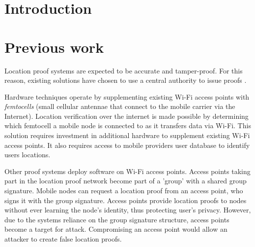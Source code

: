 \documentclass[12pt]{article}
\begin{document}
\maketitle

\begin{abstract}
\end{abstract}

\section{Introduction}

\section{Previous work}
Location proof systems are expected to be accurate and tamper-proof. For this reason, existing solutions have chosen to use a central authority to issue proofs \cite{brassil, luo, khan}.

Hardware techniques \cite{brassil} operate by supplementing existing Wi-Fi access points with \textit{femtocells} (small cellular antennae that connect to the mobile carrier via the Internet). Location verification over the internet is made possible by determining which femtocell a mobile node is connected to as it transfers data via Wi-Fi. This solution requires investment in additional hardware to supplement existing Wi-Fi access points. It also requires access to mobile providers user database to identify users locations.

Other proof systems \cite{luo} deploy software on Wi-Fi access points. Access points taking part in the location proof network become part of a 'group' with a shared group signature. Mobile nodes can request a location proof from an access point, who signs it with the group signature. Access points provide location proofs to nodes without ever learning the node's identity, thus protecting user's privacy. However, due to the systems reliance on the group signature structure, access points become a target for attack. Compromising an access point would allow an attacker to create false location proofs.
\end{document}
